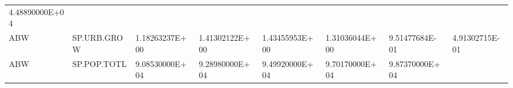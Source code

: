 \documentclass[]{article}
\begin{document}
\begin{longtable}[]{@{}llllllll@{}}
\begin{minipage}[t]{0.11\columnwidth}
4.48890000E+04\strut
\end{minipage}\tabularnewline
\begin{minipage}[t]{0.06\columnwidth}\raggedright
ABW\strut
\end{minipage} & \begin{minipage}[t]{0.08\columnwidth}\raggedright
SP.URB.GROW\strut
\end{minipage} & \begin{minipage}[t]{0.11\columnwidth}\raggedright
1.18263237E+00\strut
\end{minipage} & \begin{minipage}[t]{0.11\columnwidth}\raggedright
1.41302122E+00\strut
\end{minipage} & \begin{minipage}[t]{0.11\columnwidth}\raggedright
1.43455953E+00\strut
\end{minipage} & \begin{minipage}[t]{0.11\columnwidth}\raggedright
1.31036044E+00\strut
\end{minipage} & \begin{minipage}[t]{0.11\columnwidth}\raggedright
9.51477684E-01\strut
\end{minipage} & \begin{minipage}[t]{0.11\columnwidth}\raggedright
4.91302715E-01\strut
\end{minipage}\tabularnewline
\begin{minipage}[t]{0.06\columnwidth}\raggedright
ABW\strut
\end{minipage} & \begin{minipage}[t]{0.08\columnwidth}\raggedright
SP.POP.TOTL\strut
\end{minipage} & \begin{minipage}[t]{0.11\columnwidth}\raggedright
9.08530000E+04\strut
\end{minipage} & \begin{minipage}[t]{0.11\columnwidth}\raggedright
9.28980000E+04\strut
\end{minipage} & \begin{minipage}[t]{0.11\columnwidth}\raggedright
9.49920000E+04\strut
\end{minipage} & \begin{minipage}[t]{0.11\columnwidth}\raggedright
9.70170000E+04\strut
\end{minipage} & \begin{minipage}[t]{0.11\columnwidth}\raggedright
9.87370000E+04\strut
\end{minipage} & \begin{minipage}[t]{0.11\columnwidth}\raggedright

\end{minipage}
\end{longtable}
\end{document}
